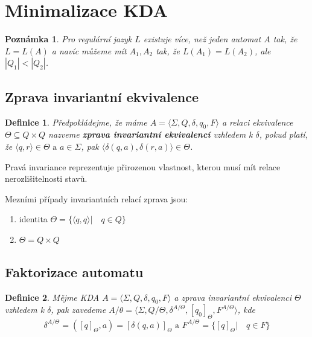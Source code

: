 \documentclass[10pt, a4paper, titlepage]{article}
\theoremstyle{note}
\newtheorem{definice}{Definice}
\newtheorem{poznamka}{Poznámka}
\begin{document}

\section{Minimalizace KDA}

\begin{poznamka}
Pro regulární jazyk $L$ existuje více, než jeden automat $A$ tak, že $L = L(A)$ a navíc můžeme mít $A_{1}, A_{2}$ tak, že
$L(A_{1}) = L(A_{2})$, ale $|Q_{1}| < |Q_{2}|$.
\end{poznamka}

\subsection{Zprava invariantní ekvivalence}

\begin{definice}
Předpokládejme, že máme $A = \langle \Sigma, Q, \delta, q_{0}, F \rangle$ a relaci ekvivalence $\Theta \subseteq Q \times Q$ nazveme
\textbf{zprava invariantní ekvivalencí} vzhledem k $\delta$, pokud platí, že $\langle q,r  \rangle \in \Theta \text{ a } a \in \Sigma$,
pak $\langle  \delta(q, a), \delta(r, a) \rangle \in \Theta$.
\end{definice}

Pravá invariance reprezentuje přirozenou vlastnost, kterou musí mít relace nerozlišitelnosti stavů.

Mezními případy invariantních relací zprava jsou:
\begin{enumerate}
\item 
identita $\Theta = \lbrace \langle q,q \rangle | \quad q \in Q \rbrace$
\item
$\Theta = Q \times Q$
\end{enumerate}

\subsection{Faktorizace automatu}

\begin{definice}
Mějme KDA $A = \langle \Sigma, Q, \delta, q_{0}, F \rangle$ a zprava invariantní ekvivalenci $\Theta$ vzhledem k
$\delta$, pak zavedeme $A/\theta = \langle \Sigma, Q/\Theta, \delta^{A/\Theta}, [q_{0}]_{\Theta}, F^{A/\Theta} \rangle$, kde
$$\delta^{A/\Theta} = ([q]_{\Theta}, a) = [\delta(q, a)]_{\Theta} \text{ a } F^{A/\Theta} = \lbrace [q]_{\Theta} | \quad q \in F \rbrace$$
\end{definice}
\end{document}
